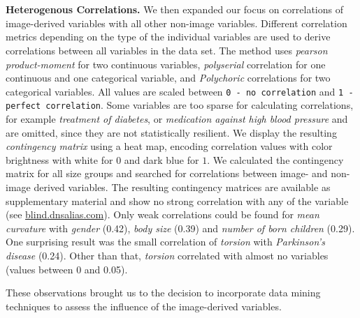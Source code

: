 \documentclass[a4paper,twoside]{style/article}
\begin{document}
\\\\
\noindent \textbf{Heterogenous Correlations.}
We then expanded our focus on correlations of image-derived variables with all other non-image variables.
Different correlation metrics depending on the type of the individual variables are used to derive correlations between all variables in the data set.
The method uses \emph{pearson product-moment} for two continuous variables, \emph{polyserial} correlation for one continuous and one categorical variable, and \emph{Polychoric} correlations for two categorical variables.
All values are scaled between \texttt{0 - no correlation} and \texttt{1 - perfect correlation}.
Some variables are too sparse for calculating correlations, for example \emph{treatment of diabetes}, or \emph{medication against high blood pressure} and are omitted, since they are not statistically resilient.
We display the resulting \emph{contingency matrix} using a heat map, encoding correlation values with color brightness with white for $0$ and dark blue for $1$.
We calculated the contingency matrix for all size groups and searched for correlations between image- and non-image derived variables.
The resulting contingency matrices are available as supplementary material and show no strong correlation with any of the variable (see \url{blind.dnsalias.com}).
Only weak correlations could be found for \emph{mean curvature} with \emph{gender} (0.42), \emph{body size} (0.39) and \emph{number of born children} (0.29).
One surprising result was the small correlation of \emph{torsion} with \emph{Parkinson's disease} (0.24).
Other than that, \emph{torsion} correlated with almost no variables (values between 0 and 0.05).

These observations brought us to the decision to incorporate data mining techniques to assess the influence of the image-derived variables.
\end{document}
